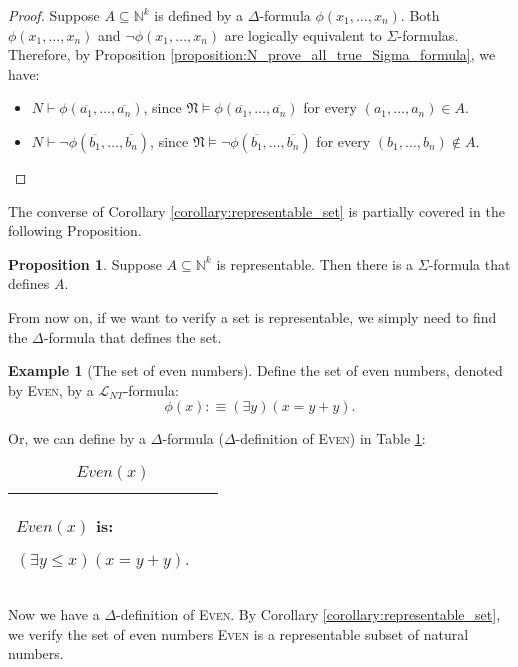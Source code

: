 \documentclass[11pt,letterpaper]{book}
\theoremstyle{definition}
\newtheorem{proposition}{Proposition}[section]
\newtheorem{example}{Example}[section]
\begin{document}
\begin{proof}
Suppose $A \subseteq \mathbb{N}^{k}$ is defined by a $\Delta$-formula
$\phi(x_1, \ldots, x_n )$. Both $\phi(x_1, \ldots, x_n )$ and $\lnot \phi(x_1, \ldots, x_n )$ are logically equivalent to $\Sigma$-formulas. Therefore, by Proposition \ref{proposition:N_prove_all_true_Sigma_formula}, we have:
\begin{itemize}
\item{$N \vdash \phi(\overline{a_1}, \ldots, \overline{a_n} )$, since $\mathfrak{N} \models \phi(\overline{a_1}, \ldots, \overline{a_n} )$ for every $(a_1, \ldots, a_n) \in A$.}
\item{$N \vdash \lnot \phi(\overline{b_1}, \ldots, \overline{b_n} )$, since $\mathfrak{N} \models \lnot \phi(\overline{b_1}, \ldots, \overline{b_n} )$ for every $(b_1, \ldots, b_n) \not \in A$.}
\end{itemize}


\end{proof}

The converse of Corollary \ref{corollary:representable_set} is partially covered in the following Proposition.

\begin{proposition}
Suppose $A \subseteq \mathbb{N}^k$ is representable. Then there is a
$\Sigma$-formula that defines $A$.
\end{proposition}

From now on, if we want to verify a set is representable, we simply need to find the $\Delta$-formula that defines the set.

\begin{example}[The set of even numbers]

Define the set of even numbers, denoted by \textsc{Even}, by a $\mathcal{L}_{NT}$-formula: $$ \phi(x) : \equiv
(\exists y ) (x = y + y)  .$$

Or, we can define by a $\Delta$-formula ($\Delta$-definition of \textsc{Even}) in Table \ref{box:even_numbers}:
\begin{table}[h]
\caption{$ Even(x) $}
\label{box:even_numbers}
\begin{tabular}{|p{0.9\linewidth}|}
\hline
\rule{0pt}{3ex}
$ Even(x) $ is:
\begin{center}
$ (\exists y \leq x ) (x = y + y).$
\end{center} \\
\hline
\end{tabular}
\end{table}

Now we have a $\Delta$-definition of \textsc{Even}. By Corollary
\ref{corollary:representable_set}, we verify the set of even numbers \textsc{Even} is a representable subset of natural numbers.


\end{example}
\end{document}
